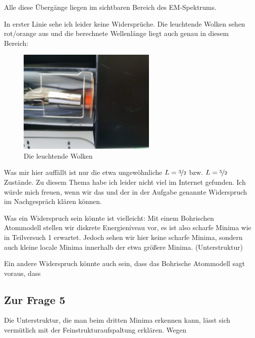 		Alle diese Übergänge liegen im sichtbaren Bereich des EM-Spektrums.

		In erster Linie sehe ich leider keine Widersprüche. Die leuchtende Wolken sehen rot/orange aus und die berechnete Wellenlänge liegt auch genau in diesem Bereich:
		\begin{figure}[!ht]
		    \centering
		    \includegraphics[width=0.6\textwidth]{./images/fhv-neon.jpg}
		    \caption{Die leuchtende Wolken}
		    \label{fig:fhv-neon}
		\end{figure}

		Was mir hier auffällt ist nur die etwa ungewöhnliche $L = \nicefrac{3}{2}$ bzw. $L = \nicefrac{5}{2}$ Zustände. Zu diesem Thema habe ich leider nicht viel im Internet gefunden. Ich würde mich freuen, wenn wir das und der in der Aufgabe genannte Widerspruch im Nachgespräch klären können. 

		Was ein Widerspruch sein könnte ist vielleicht: Mit einem Bohrischen Atommodell stellen wir diskrete Energieniveau vor, es ist also scharfe Minima wie in Teilversuch 1 erwartet. Jedoch sehen wir hier keine scharfe Minima, sondern auch kleine locale Minima innerhalb der etwa größere Minima. (Unterstruktur)

		Ein andere Widerspruch könnte auch sein, dass das Bohrische Atommodell sagt voraus, dass 

	\subsection{Zur Frage 5}
		Die Unterstruktur, die man beim dritten Minima erkennen kann, lässt sich vermütlich mit der Feinstrukturaufspaltung erklären. Wegen 




	